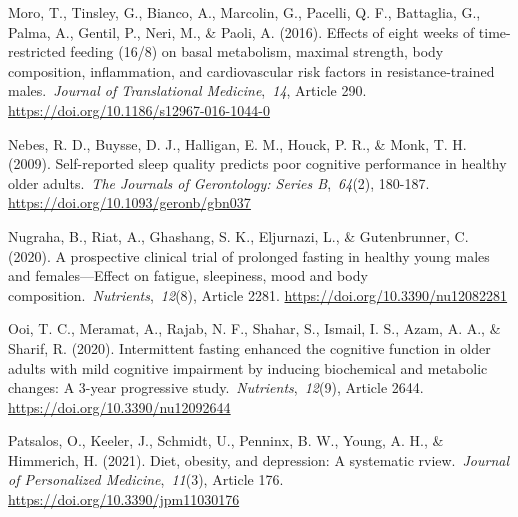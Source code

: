 \documentclass[authordate, empirical,issue]{jote-new-article}
\begin{document}



Moro, T., Tinsley, G., Bianco, A., Marcolin, G., Pacelli, Q. F., Battaglia, G., Palma, A., Gentil, P., Neri, M., \& Paoli, A. (2016). Effects of eight weeks of time-restricted feeding (16/8) on basal metabolism, maximal strength, body composition, inflammation, and cardiovascular risk factors in resistance-trained males. \emph{Journal of Translational Medicine}, \emph{14}, Article 290. \url{https://doi.org/10.1186/s12967-016-1044-0}



Nebes, R. D., Buysse, D. J., Halligan, E. M., Houck, P. R., \& Monk, T. H. (2009). Self-reported sleep quality predicts poor cognitive performance in healthy older adults. \emph{The Journals of Gerontology: Series B}, \emph{64}(2), 180-187. \url{https://doi.org/10.1093/geronb/gbn037}



Nugraha, B., Riat, A., Ghashang, S. K., Eljurnazi, L., \& Gutenbrunner, C. (2020). A prospective clinical trial of prolonged fasting in healthy young males and females—Effect on fatigue, sleepiness, mood and body composition. \emph{Nutrients}, \emph{12}(8), Article 2281. \url{https://doi.org/10.3390/nu12082281}



Ooi, T. C., Meramat, A., Rajab, N. F., Shahar, S., Ismail, I. S., Azam, A. A., \& Sharif, R. (2020). Intermittent fasting enhanced the cognitive function in older adults with mild cognitive impairment by inducing biochemical and metabolic changes: A 3-year progressive study. \emph{Nutrients}, \emph{12}(9), Article 2644. \url{https://doi.org/10.3390/nu12092644}






Patsalos, O., Keeler, J., Schmidt, U., Penninx, B. W., Young, A. H., \& Himmerich, H. (2021). Diet, obesity, and depression: A systematic rview. \emph{Journal of Personalized Medicine}, \emph{11}(3), Article 176. \href{https://doi.org/10.3390/jpm11030176}{https://doi.org/10.3390/jpm11030176}
\end{document}
